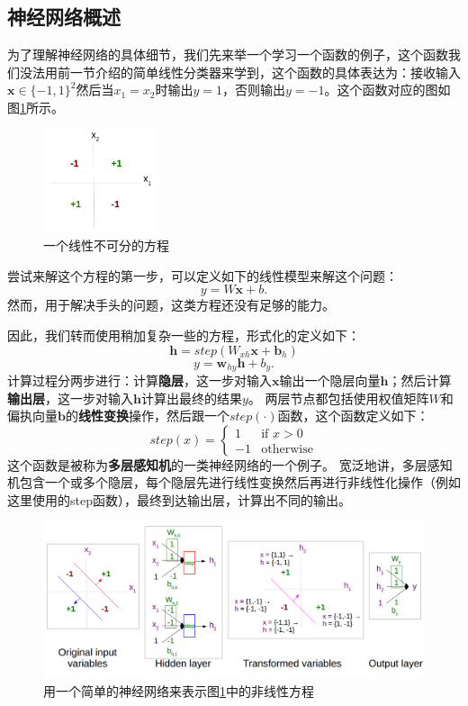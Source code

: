 \documentclass[10pt,a4paper]{ctexart}
\begin{document}
\subsection{神经网络概述}
为了理解神经网络的具体细节，我们先来举一个学习一个函数的例子，这个函数我们没法用前一节介绍的简单线性分类器来学到，这个函数的具体表达为：接收输入$\textbf{x} \in \{-1,1\}^2$然后当$x_1=x_2$时输出$y=1$，否则输出$y=-1$。这个函数对应的图如图\ref{fig:7}所示。

\begin{figure}[H]
\centering
\includegraphics[width=0.3\textwidth]{fig7.png}
\caption{一个线性不可分的方程}
\label{fig:7}
\end{figure}

尝试来解这个方程的第一步，可以定义如下的线性模型来解这个问题：
\[
 y = W\textbf{x} + b.
\]
然而，用于解决手头的问题，这类方程还没有足够的能力。

因此，我们转而使用稍加复杂一些的方程，形式化的定义如下：
\[
 \textbf{h} = step(W_{xh}\textbf{x} + \textbf{b}_h)
\]
\[
 y = \textbf{w}_{hy}\textbf{h} + b_y.
\]
计算过程分两步进行：计算\textbf{隐层}，这一步对输入$\textbf{x}$输出一个隐层向量$\textbf{h}$；然后计算\textbf{输出层}，这一步对输入$\textbf{h}$计算出最终的结果$y$。
两层节点都包括使用权值矩阵$W$和偏执向量$\textbf{b}$的\textbf{线性变换}操作，然后跟一个$step(\cdot)$函数，这个函数定义如下：
\[
 step(x) = \left\{ \begin{array}{ll}
  1 & \textrm{if $x > 0$} \\
  -1 & \textrm{otherwise}
  \end{array} \right.
\]
这个函数是被称为\textbf{多层感知机}的一类神经网络的一个例子。
宽泛地讲，多层感知机包含一个或多个隐层，每个隐层先进行线性变换然后再进行非线性化操作（例如这里使用的step函数），最终到达输出层，计算出不同的输出。

\begin{figure}[H]
\centering
\includegraphics[width=1\textwidth]{fig8.png}
\caption{用一个简单的神经网络来表示图\ref{fig:7}中的非线性方程}
\label{fig:8}
\end{figure}
\end{document}
